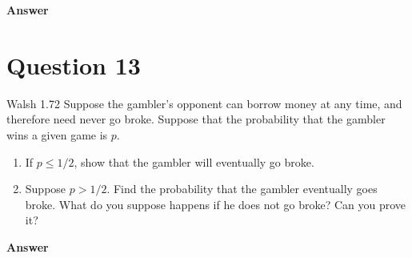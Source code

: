 \documentclass[letterpaper]{article}
\begin{document}
		

		
		\textbf{Answer}
		
		\clearpage
		
		\section{Question 13}
		
		{\color{deepred} Walsh 1.72} Suppose the gambler's opponent can borrow money at any time, and therefore need never go broke. Suppose that the probability that the gambler wins a given game is $p$.
	
\begin{enumerate}
\item[(a)] If $p \le 1/2$, show that the gambler will eventually go broke.
\item[(b)] Suppose $p > 1/2$. Find the probability that the gambler eventually goes broke. What do you suppose happens if he does not go broke? Can you prove it?
\end{enumerate}
		
		\textbf{Answer}
		
		\clearpage
		
		
		
		
		
		
		
		
	
\end{document}
